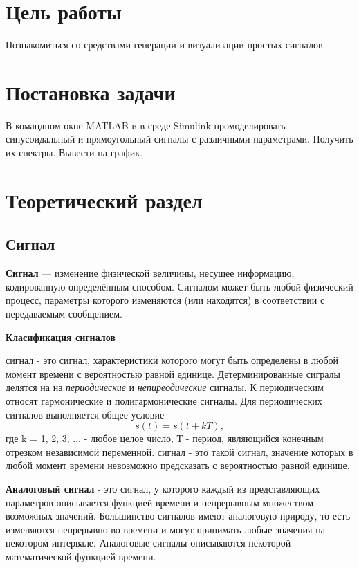 \documentclass[a4paper]{article}
\begin{document}
\vfill %

\section{Цель работы}
Познакомиться со средствами генерации и визуализации простых сигналов.

\section{Постановка задачи}
В командном окне MATLAB и в среде Simulink промоделировать синусоидальный и прямоугольный сигналы с различными параметрами. Получить их спектры. Вывести на график.

\section{Теоретический раздел}
\subsection{Сигнал}
{\bfseries Сигнал} — изменение физической величины, несущее информацию, кодированную определённым способом. Сигналом может быть любой физический процесс, параметры которого изменяются (или находятся) в соответствии с передаваемым сообщением.

 {\bfseries Класификация сигналов}
\begin{itemize}
	 сигнал - это  сигнал, характеристики которого могут быть определены в любой момент времени с вероятностью равной единице. Детерминированные сигралы делятся на на  \textit{периодические} и \textit{непиреодические} сигналы. К периодическим относят гармонические и полигармонические сигналы. Для периодических сигналов выполняется общее условие 
	\begin{equation}
	s(t) = s(t + kT),
	\end{equation}
	где k = 1, 2, 3, ... - любое целое число, Т - период, являющийся конечным отрезком независимой переменной.
	 сигнал - это такой сигнал, значение которых в любой момент времени невозможно предсказать с вероятностью равной единице.
\end{itemize}

{\bfseries Аналоговый сигнал} - это сигнал, у которого каждый из представляющих параметров описывается функцией времени и непрерывным множеством возможных значений. Большинство сигналов имеют аналоговую природу, то есть изменяются непрерывно во времени и могут принимать любые значения на некотором интервале. Аналоговые сигналы описываются некоторой математической функцией времени.
\end{document}
